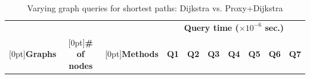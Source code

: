\begin{table}[t!]
\caption{Varying graph queries for shortest paths: Dijkstra  vs. Proxy+Dijkstra}\label{tab:performance_path_queries_dj}
\vspace{-2ex}
\begin{center}


\begin{tabular}{|c|c|c||r|r|r|r|r|r|r|}
\hline
  & &   & \multicolumn{7}{c|}{\bf Query time ($\times 10^{-6}$ sec.)} \\
\cline{4-10}

\raisebox{1.5ex}[0pt]{\bf Graphs}&\raisebox{1.5ex}[0pt]{\bf \# of nodes} & \raisebox{1.5ex}[0pt]{\bf Methods} & {\bf Q1} & {\bf Q2} & {\bf Q3} & {\bf Q4} & {\bf Q5} & {\bf Q6} & {\bf Q7}  \\ \hline \hline


\end{tabular}
\end{center}
\end{table}
